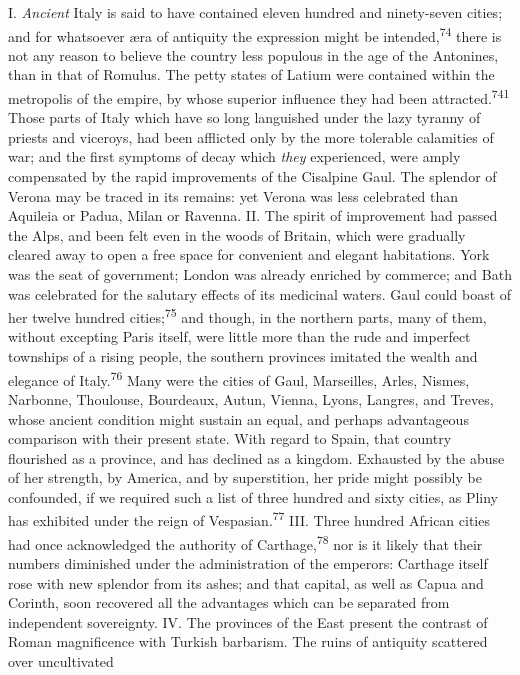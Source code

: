 I. \textit{Ancient} Italy is said to have contained eleven hundred and
ninety-seven cities; and for whatsoever æra of antiquity the
expression might be intended,\textsuperscript{74} there is not any reason to
believe the country less populous in the age of the Antonines,
than in that of Romulus. The petty states of Latium were
contained within the metropolis of the empire, by whose superior
influence they had been attracted.\textsuperscript{741} Those parts of Italy which
have so long languished under the lazy tyranny of priests and
viceroys, had been afflicted only by the more tolerable
calamities of war; and the first symptoms of decay which \textit{they}
experienced, were amply compensated by the rapid improvements of
the Cisalpine Gaul. The splendor of Verona may be traced in its
remains: yet Verona was less celebrated than Aquileia or Padua,
Milan or Ravenna. II. The spirit of improvement had passed the
Alps, and been felt even in the woods of Britain, which were
gradually cleared away to open a free space for convenient and
elegant habitations. York was the seat of government; London was
already enriched by commerce; and Bath was celebrated for the
salutary effects of its medicinal waters. Gaul could boast of her
twelve hundred cities;\textsuperscript{75} and though, in the northern parts, many
of them, without excepting Paris itself, were little more than
the rude and imperfect townships of a rising people, the southern
provinces imitated the wealth and elegance of Italy.\textsuperscript{76} Many were
the cities of Gaul, Marseilles, Arles, Nismes, Narbonne,
Thoulouse, Bourdeaux, Autun, Vienna, Lyons, Langres, and Treves,
whose ancient condition might sustain an equal, and perhaps
advantageous comparison with their present state. With regard to
Spain, that country flourished as a province, and has declined as
a kingdom. Exhausted by the abuse of her strength, by America,
and by superstition, her pride might possibly be confounded, if
we required such a list of three hundred and sixty cities, as
Pliny has exhibited under the reign of Vespasian.\textsuperscript{77} III. Three
hundred African cities had once acknowledged the authority of
Carthage,\textsuperscript{78} nor is it likely that their numbers diminished under
the administration of the emperors: Carthage itself rose with new
splendor from its ashes; and that capital, as well as Capua and
Corinth, soon recovered all the advantages which can be separated
from independent sovereignty. IV. The provinces of the East
present the contrast of Roman magnificence with Turkish
barbarism. The ruins of antiquity scattered over uncultivated
